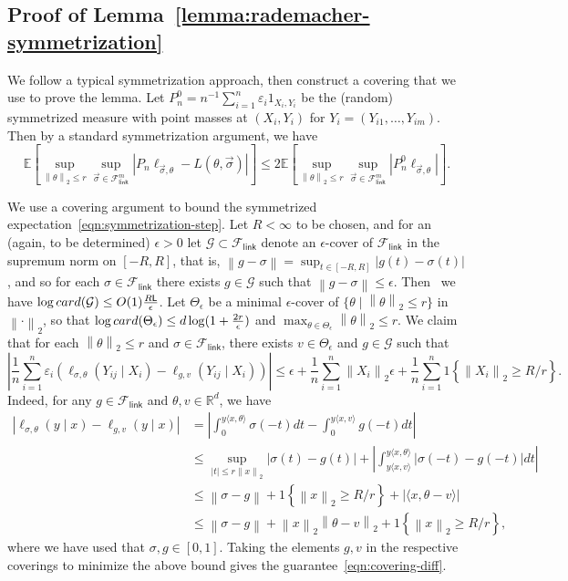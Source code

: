 \documentclass[11pt]{article}
\newcommand{\E}{\mathbb{E}}
\newcommand{\R}{\mathbb{R}} %
\newcommand{\mc}[1]{\mathcal{#1}}
\newcommand{\norm}[1]{\left\|{#1}\right\|} %
\newcommand{\Flink}{\mathcal{F}_{\mathsf{link}}}
\newcommand{\lipconst}{\mathsf{L}}
\newcommand{\loss}{\ell}
\newcommand{\ltwo}[1]{\norm{#1}_2} %
\newcommand{\<}{\langle} %
\renewcommand{\>}{\rangle}
\newcommand{\indic}[1]{1\!\left\{{#1}\right\}}
\newcommand{\card}{\textup{card}}
\begin{document}
\subsection{Proof of Lemma~\ref{lemma:rademacher-symmetrization}} \label{proof:rademacher-symmetrization}
We follow a typical symmetrization approach, then construct a covering
that we use to prove the lemma.
Let $P_n^0 = n^{-1} \sum_{i = 1}^n \varepsilon_i 1_{X_i, Y_i}$ be the
(random) symmetrized measure with point masses at $(X_i, Y_i)$ for
$Y_i = (Y_{i1}, \ldots, Y_{im})$. Then by a standard symmetrization
argument, we have
\begin{equation}
	\label{eqn:symmetrization-step}
	\E\left[\sup_{\ltwo{\theta} \le r}
	\sup_{\vec{\sigma} \in \Flink^m} |P_n \loss_{\vec{\sigma},\theta} - L(\theta,
	\vec{\sigma})|\right]
	\le 2 \E\left[\sup_{\ltwo{\theta} \le r}
	\sup_{\vec{\sigma} \in \Flink^m} \left|P_n^0 \loss_{\vec{\sigma}, \theta}
	\right|\right].
\end{equation}

We use a covering argument to bound the symmetrized
expectation~\eqref{eqn:symmetrization-step}.  Let $R < \infty$ to be
chosen, and for an (again, to be determined) $\epsilon > 0$ let $\mc{G}
\subset \Flink$
denote an $\epsilon$-cover of $\Flink$ in the supremum norm on $[-R, R]$,
that is, $\norm{g - \sigma} = \sup_{t \in [-R,R]} |g(t) - \sigma(t)|$, and
so for each $\sigma \in \Flink$ there exists $g \in \mc{G}$ such that
$\norm{g - \sigma} \le \epsilon$. Then~\cite[Ch.~2.7]{VanDerVaartWe96} we
have $\log \card(\mc{G}) \le O(1) \frac{R \lipconst}{\epsilon}$. Let
$\Theta_\epsilon$ be a minimal $\epsilon$-cover of $\{\theta \mid
\ltwo{\theta} \le r\}$ in $\ltwo{\cdot}$, so that $\log
\card(\Theta_\epsilon) \le d \log(1 + \frac{2r}{\epsilon})$
and $\max_{\theta \in \Theta_\epsilon} \ltwo{\theta} \le r$.
We claim that for each $\ltwo{\theta} \le r$ and $\sigma
\in \Flink$, there exists
$v \in \Theta_\epsilon$ and $g \in \mc{G}$ such that
\begin{equation}
	\left|\frac{1}{n} \sum_{i = 1}^n \varepsilon_i
	\left(\loss_{\sigma, \theta}(Y_{ij} \mid X_i)
	-
	\loss_{g, v}(Y_{ij} \mid X_i)\right)
	\right|
	\le \epsilon +
	\frac{1}{n}\sum_{i = 1}^n \ltwo{X_i} \epsilon
	+ \frac{1}{n} \sum_{i = 1}^n\indic{\ltwo{X_i} \ge R / r}.
	\label{eqn:covering-diff}
\end{equation}
Indeed, for any $g \in \Flink$ and $\theta, v \in \R^d$, we have
\begin{align*}
	\left|\loss_{\sigma, \theta}(y \mid x)
	- \loss_{g, v}(y \mid x)\right|
	& = \left|\int_0^{y \<x, \theta\>} \sigma(-t) dt
	- \int_0^{y \<x, v\>} g(-t) dt\right| \\
	& \le \sup_{|t| \le r \ltwo{x}} |\sigma(t) - g(t)|
	+ \left|\int_{y\<x, v\>}^{y\<x, \theta\>}
	|\sigma(-t) - g(-t)| dt \right| \\
	& \le \norm{\sigma - g} + \indic{\ltwo{x} \ge R/r}
	+ |\<x, \theta - v\>| \\
	& \le
	\norm{\sigma - g} + \ltwo{x} \ltwo{\theta - v}
	+ \indic{\ltwo{x} \ge R/r},
\end{align*}
where we have used that $\sigma, g \in [0, 1]$.
Taking the elements $g, v$ in the respective coverings to minimize
the above bound gives the guarantee~\eqref{eqn:covering-diff}.
\end{document}
